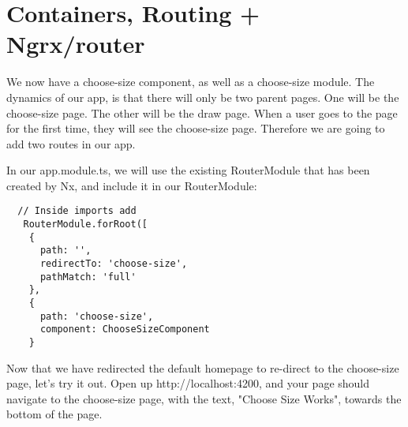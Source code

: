 \maketitle{}
\section{ Containers, Routing + Ngrx/router }

We now have a choose-size component, as well as a choose-size module.
The dynamics of our app, is that there will only be two parent pages. One will
be the choose-size page. The other will be the draw page. When a user goes to
the page for the first time, they will see the choose-size page. Therefore we
are going to add two routes in our app.

In our app.module.ts, we will use the existing RouterModule that has been
created by Nx, and include it in our RouterModule:

\begin{verbatim}
  // Inside imports add
   RouterModule.forRoot([
    {
      path: '',
      redirectTo: 'choose-size',
      pathMatch: 'full'
    },
    {
      path: 'choose-size',
      component: ChooseSizeComponent
    }
\end{verbatim}


Now that we have redirected the default homepage to re-direct to the
choose-size page, let's try it out. Open up http://localhost:4200, and your page
should navigate to the choose-size page, with the text, "Choose Size Works",
towards the bottom of the page. 
